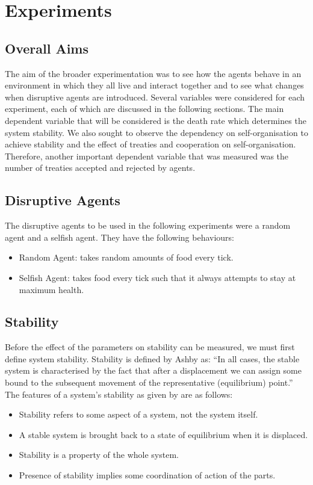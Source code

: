 \chapter{Experiments}\label{experiments}

\section{Overall Aims}
\label{sec: Overall Aims}
The aim of the broader experimentation was to see how the agents behave in an environment in which they all live and interact together and to see what changes when disruptive agents are introduced.
Several variables were considered for each experiment, each of which are discussed in the following sections.
The main dependent variable that will be considered is the death rate which determines the system stability. We also sought to observe the dependency on self-organisation to achieve stability and the effect of treaties and cooperation on self-organisation. Therefore, another important dependent variable that was measured was the number of treaties accepted and rejected by agents.

\section{Disruptive Agents}
\label{sec: Disruptive Agents}
The disruptive agents to be used in the following experiments were a random agent and a selfish agent. They have the following behaviours:
\begin{itemize}
    \item Random Agent: takes random amounts of food every tick.
    \item Selfish Agent: takes food every tick such that it always attempts to stay at maximum health.
\end{itemize}

\section{Stability}
\label{sec: Stability}
Before the effect of the parameters on stability can be measured, we must first define system stability. Stability is defined by Ashby as: “In all cases, the stable system is characterised by the fact that after a displacement we can assign some bound to the subsequent movement of the representative (equilibrium) point.”\cite{Ashby1960}
The features of a system's stability as given by \cite{Ashby1960} are as follows:
\begin{itemize}
    \item Stability refers to some aspect of a system, not the system itself.
    \item A stable system is brought back to a state of equilibrium when it is displaced.
    \item Stability is a property of the whole system.
    \item Presence of stability implies some coordination of action of the parts.
\end{itemize}
 
